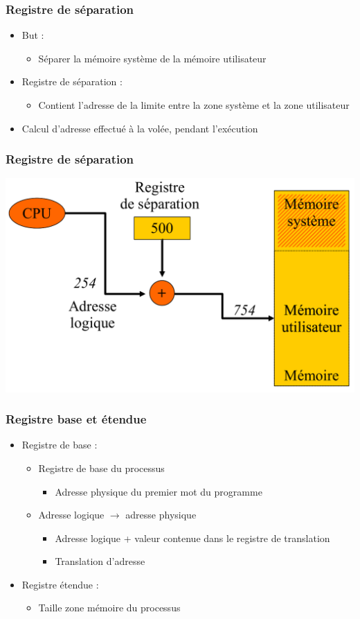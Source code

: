 \begin{frame}
\frametitle{Registre de séparation}
\begin{itemize}
\item But :
\begin{itemize}
\item Séparer la mémoire système de la mémoire utilisateur
\end{itemize}
\item Registre de séparation :
\begin{itemize}
\item Contient l'adresse de la limite entre la zone système et la zone utilisateur
\end{itemize}
\item Calcul d'adresse effectué à la volée, pendant l'exécution
\end{itemize}
\end{frame}

\begin{frame}
\frametitle{Registre de séparation}
\includegraphics[width=\textwidth]{../illustration/memoire_principale_registre_sep.pdf}
\end{frame}


\begin{frame}
\frametitle{Registre base et étendue}
\begin{itemize}
\item Registre de base :
\begin{itemize}
\item Registre de base du processus
\begin{itemize}
\item Adresse physique du premier mot du programme
\end{itemize}
\item Adresse logique $\rightarrow$ adresse physique
\begin{itemize}
\item Adresse logique + valeur contenue dans le registre de translation
\item Translation d'adresse
\end{itemize}
\end{itemize}
\item Registre étendue :
\begin{itemize}
\item Taille zone mémoire du processus
\end{itemize}
\end{itemize}
\end{frame}


